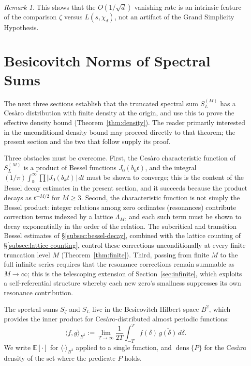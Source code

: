 \documentclass[12pt,reqno]{amsart}
\theoremstyle{plain}
\theoremstyle{definition}
\theoremstyle{remark}
\newtheorem{remark}[theorem]{Remark}
\DeclareMathOperator{\dens}{dens}
\newcommand{\E}{\mathbb{E}}
\begin{document}
\begin{remark}
This shows that the $O(1/\sqrt{d})$ vanishing rate is an intrinsic feature of the comparison $\zeta$ versus $L(s,\chi_d)$, not an artifact of the Grand Simplicity Hypothesis.
\end{remark}


\section{Besicovitch Norms of Spectral Sums}\label{sec:besicovitch}

The next three sections establish that the truncated spectral sum $S_L^{(M)}$ has a Ces\`aro distribution with finite density at the origin, and use this to prove the effective density bound (Theorem~\ref{thm:density}).  The reader primarily interested in the unconditional density bound may proceed directly to that theorem; the present section and the two that follow supply its proof.

Three obstacles must be overcome.  First, the Ces\`aro characteristic function of $S_L^{(M)}$ is a product of Bessel functions $J_0(b_k t)$, and the integral $(1/\pi)\int_0^\infty \prod |J_0(b_k t)|\,dt$ must be shown to converge; this is the content of the Bessel decay estimates in the present section, and it succeeds because the product decays as $t^{-M/2}$ for $M \geq 3$.  Second, the characteristic function is not simply the Bessel product: integer relations among zero ordinates (resonances) contribute correction terms indexed by a lattice $\Lambda_M$, and each such term must be shown to decay exponentially in the order of the relation.  The subcritical and transition Bessel estimates of \S\ref{subsec:bessel-decay}, combined with the lattice counting of \S\ref{subsec:lattice-counting}, control these corrections unconditionally at every finite truncation level $M$ (Theorem~\ref{thm:finite}).  Third, passing from finite $M$ to the full infinite series requires that the resonance corrections remain summable as $M \to \infty$; this is the telescoping extension of Section~\ref{sec:infinite}, which exploits a self-referential structure whereby each new zero's smallness suppresses its own resonance contribution.

The spectral sums $S_\zeta$ and $S_L$ live in the Besicovitch Hilbert space $B^2$, which provides the inner product for Ces\`aro-distributed almost periodic functions:
\[
  \langle f, g\rangle_{B^2} := \lim_{T\to\infty} \frac{1}{2T}\int_{-T}^T f(\delta)\,\overline{g(\delta)}\, d\delta.
\]
We write $\E[\cdot]$ for $\langle \cdot \rangle_{B^2}$ applied to a single function, and $\dens\{P\}$ for the Ces\`aro density of the set where the predicate $P$ holds.
\end{document}
